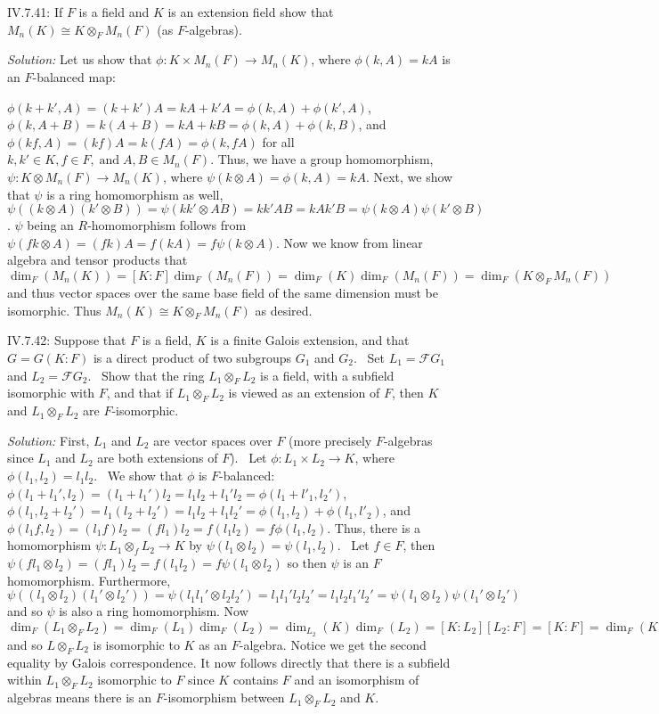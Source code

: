 \documentclass{letter}
\newcommand{\tmem}[1]{{\em #1\/}}
\newcommand{\tmop}[1]{\ensuremath{\operatorname{#1}}}
\begin{document}
IV.7.41: If $F$ is a field and $K$ is an extension field show that $M_n (K)
\cong K \otimes_F M_n (F)$ (as $F$-algebras).

{\tmem{Solution:}} Let us show that $\phi : K \times M_n (F) \rightarrow M_n
(K)$, where $\phi (k, A) = k A$ is an $F$-balanced map:

$\phi (k + k', A) = (k + k') A = k A + k' A = \phi (k, A) + \phi (k', A)$,
$\phi (k, A + B) = k (A + B) = k A + k B = \phi (k, A) + \phi (k, B)$, and
$\phi (k f, A) = (k f) A = k (f A) = \phi (k, f A)$ for all $k, k' \in K, f
\in F, \tmop{and} A, B \in M_n (F)$. Thus, we have a group homomorphism, $\psi
: K \otimes M_n (F) \rightarrow M_n (K)$, where $\psi (k \otimes A) = \phi (k,
A) = k A$. Next, we show that $\psi$ is a ring homomorphism as well, $\psi ((k
\otimes A) (k' \otimes B)) = \psi (k k' \otimes A B) = k k' A B = k A k' B =
\psi (k \otimes A) \psi (k' \otimes B)$. $\psi$ being an $R$-homomorphism
follows from $\psi (f k \otimes A) = (f k) A = f (k A) = f \psi (k \otimes
A)$. Now we know from linear algebra and tensor products that $\dim_F (M_n
(K)) = [K : F] \dim_F (M_n (F)) = \dim_F (K) \dim_F (M_n (F)) = \dim_F (K
\otimes_F M_n (F))$ and thus vector spaces over the same base field of the
same dimension must be isomorphic. Thus $M_n (K) \cong K \otimes_F M_n (F)$ as
desired.

IV.7.42: Suppose that $F$ is a field, $K$ is a finite Galois extension, and
that $G = G (K : F)$ is a direct product of two subgroups $G_1$ and $G_2$. \
Set $L_1 =\mathcal{F}G_1$ and $L_2 =\mathcal{F}G_2$. \ Show that the ring $L_1
\otimes_F L_2$ is a field, with a subfield isomorphic with $F$, and that if
$L_1 \otimes_F L_2$ is viewed as an extension of $F$, then $K$ and $L_1
\otimes_F L_2$ are $F$-isomorphic.

{\tmem{Solution:}} First, $L_1$ and $L_2$ are vector spaces over $F$ (more
precisely $F$-algebras since $L_1$ and $L_2$ are both extensions of $F$). \
Let $\phi : L_1 \times L_2 \rightarrow K$, where $\phi (l_1, l_2) = l_1 l_2$.
\ We show that $\phi$ is $F$-balanced: $\phi (l_1 + l_1', l_2) = (l_1 + l_1')
l_2 = l_1 l_2 + l_1' l_2 = \phi (l_1 + l'_1, l_2')$, $\phi (l_1, l_2 + l_2') =
l_1 (l_2 + l_2') = l_1 l_2 + l_1 l_2' = \phi (l_1, l_2) + \phi (l_1, l'_2)$,
and $\phi (l_1 f, l_2) = (l_1 f) l_2 = (f l_1) l_2 = f (l_1 l_2) = f \phi
(l_1, l_2)$. Thus, there is a homomorphism $\psi : L_1 \otimes_f L_2
\rightarrow K$ by $\psi (l_1 \otimes l_2) = \psi (l_1, l_2)$. \ Let $f \in F$,
then $\psi (f l_1 \otimes l_2) = (f l_1) l_2 = f (l_1 l_2) = f \psi (l_1
\otimes l_2)$ so then $\psi$ is an $F$ homomorphism. Furthermore, $\psi ((l_1
\otimes l_2) (l_1' \otimes l_2')) = \psi (l_1 l_1' \otimes l_2 l_2') = l_1
l_1' l_2 l_2' = l_1 l_2 l_1' l_2' = \psi (l_1 \otimes l_2) \psi (l_1' \otimes
l_2')$ and so $\psi$ is also a ring homomorphism. Now $\dim_F (L_1 \otimes_F
L_2) = \dim_F (L_1) \dim_F (L_2) = \dim_{L_2} (K) \dim_F (L_2) = [K : L_2]
[L_2 : F] = [K : F] = \dim_F (K)$ and so $L \otimes_F L_2$ is isomorphic to
$K$ as an $F$-algebra. Notice we get the second equality by Galois
correspondence. It now follows directly that there is a subfield within $L_1
\otimes_F L_2$ isomorphic to $F$ since $K$ contains $F$ and an isomorphism of
algebras means there is an $F$-isomorphism between $L_1 \otimes_F L_2$ and
$K$.
\end{document}
